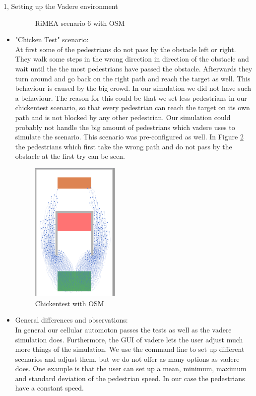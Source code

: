 \documentclass[10pt,a4paper]{article}
\begin{document}
\begin{task}{1, Setting up the Vadere environment}
\begin{itemize}
\begin{figure}[H]
        \caption{RiMEA scenario 6 with OSM}
        \label{fig:rimea6_osm}
    \end{figure}
    \item "Chicken Test" scenario: \\
    At first some of the pedestrians do not pass by the obstacle left or right. They walk some steps in the wrong direction in direction of the obstacle and wait until the the most pedestrians have passed the obstacle. Afterwards they turn around and go back on the right path and reach the target as well. This behaviour is caused by the big crowd. In our simulation we did not have such a behaviour. The reason for this could be that we set less pedestrians in our chickentest scenario, so that every pedestrian can reach the target on its own path and is not blocked by any other pedestrian. Our simulation could probably not handle the big amount of pedestrians which vadere uses to simulate the scenario. This scenario was pre-configured as well. In Figure \ref{fig:chickentest_osm} the pedestrians which first take the wrong path and do not pass by the obstacle at the first try can be seen.
    \begin{figure}[H]
        \centering
        \includegraphics[width=0.4\textwidth]{pictures/osm/chickentest.png}
        \caption{Chickentest with OSM}
        \label{fig:chickentest_osm}
    \end{figure}
    \item General differences and observations: \\
    In general our cellular automoton passes the tests as well as the vadere simulation does. Furthermore, the GUI of vadere lets the user adjust much more things of the simulation. We use the command line to set up different scenarios and adjust them, but we do not offer as many options as vadere does. One example is that the user can set up a mean, minimum, maximum and standard deviation of the pedestrian speed. In our case the pedestrians have a constant speed.
\end{itemize}
\end{task}
\end{document}
